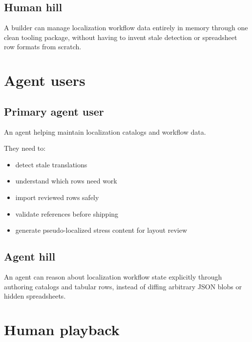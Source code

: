 \subsection{Human hill}\label{record-189-human-hill}

A builder can manage localization workflow data entirely in memory through one clean tooling package, without having to invent stale detection or spreadsheet row formats from scratch.

\section{Agent users}\label{record-189-agent-users}

\subsection{Primary agent user}\label{record-189-primary-agent-user}

An agent helping maintain localization catalogs and workflow data.

They need to:

\begin{itemize}
\tightlist
\item
  detect stale translations
\item
  understand which rows need work
\item
  import reviewed rows safely
\item
  validate references before shipping
\item
  generate pseudo-localized stress content for layout review
\end{itemize}

\subsection{Agent hill}\label{record-189-agent-hill}

An agent can reason about localization workflow state explicitly through authoring catalogs and tabular rows, instead of diffing arbitrary JSON blobs or hidden spreadsheets.

\section{Human playback}\label{record-189-human-playback}

